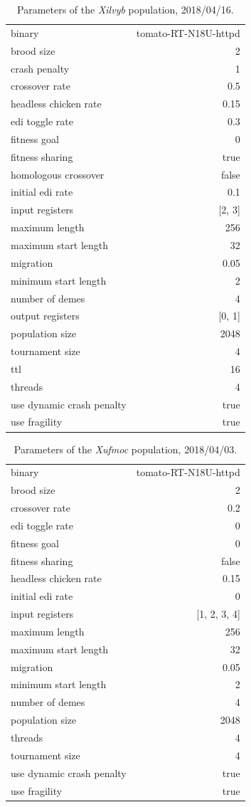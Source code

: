 \documentclass[12pt,glossary]{dalthesis}
\begin{document}
\begin{table}[htbp]
\caption{Parameters of the \emph{Xilvyb} population, 2018/04/16.}
\centering
\begin{tabular}{lr}
binary & tomato-RT-N18U-httpd\\
brood size & 2\\
crash penalty & 1\\
crossover rate & 0.5\\
headless chicken rate & 0.15\\
edi toggle rate & 0.3\\
fitness goal & 0\\
fitness sharing & true\\
homologous crossover & false\\
initial edi rate & 0.1\\
input registers & [2, 3]\\
maximum length & 256\\
maximum start length & 32\\
migration & 0.05\\
minimum start length & 2\\
number of demes & 4\\
output registers & [0, 1]\\
population size & 2048\\
tournament size & 4\\
ttl & 16\\
threads & 4\\
use dynamic crash penalty & true\\
use fragility & true\\
\end{tabular}
\end{table}

\begin{table}[htbp]
\caption{Parameters of the \emph{Xufmoc} population, 2018/04/03.}
\centering
\begin{tabular}{lr}
binary & tomato-RT-N18U-httpd\\
brood size & 2\\
crossover rate & 0.2\\
edi toggle rate & 0\\
fitness goal & 0\\
fitness sharing & false\\
headless chicken rate & 0.15\\
initial edi rate & 0\\
input registers & [1, 2, 3, 4]\\
maximum length & 256\\
maximum start length & 32\\
migration & 0.05\\
minimum start length & 2\\
number of demes & 4\\
population size & 2048\\
threads & 4\\
tournament size & 4\\
use dynamic crash penalty & true\\
use fragility & true\\
\end{tabular}
\end{table}
\end{document}
